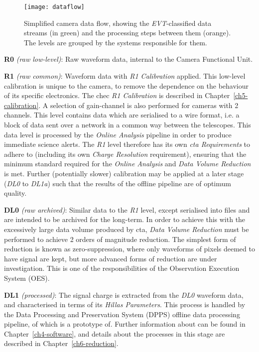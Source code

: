 \begin{wrapfigure}[36]{r}{0.32\textwidth}
  \texttt{[image: dataflow]}
  \caption{Simplified camera data flow, showing the \textit{EVT}-classified data streams (in green) and
the processing steps between them (orange). The levels are grouped by the systems responsible for them.}\label{fig:dataflow}
\end{wrapfigure}

\textbf{R0} \textit{(raw low-level)}:
Raw waveform data, internal to the Camera Functional Unit.

\textbf{R1} \textit{(raw common)}:
Waveform data with \textit{R1 Calibration} applied. This low-level calibration is unique to the camera, to remove the dependence on the behaviour of its specific electronics. The \gls{chec} \textit{R1 Calibration} is described in Chapter~\ref{ch5-calibration}. A selection of gain-channel is also performed for cameras with 2 channels. This level contains data which are serialised to a wire format, i.e. a block of data sent over a network in a common way between the telescopes. This data level is processed by the \textit{Online Analysis} pipeline in order to produce immediate science alerts. The \textit{R1} level therefore has its own \textit{\gls{cta} Requirements} to adhere to (including its own \textit{Charge Resolution} requirement), ensuring that the minimum standard required for the \textit{Online Analysis} and \textit{Data Volume Reduction} is met. Further (potentially slower) calibration may be applied at a later stage (\textit{DL0} to \textit{DL1a}) such that the results of the offline pipeline are of optimum quality.

\textbf{DL0} \textit{(raw archived)}: Similar data to the \textit{R1} level, except serialised into files and are intended to be archived for the long-term. In order to achieve this with the excessively large data volume produced by \gls{cta}, \textit{Data Volume Reduction} must be performed to achieve 2 orders of magnitude reduction. The simplest form of reduction is known as zero-suppression, where only waveforms of pixels deemed to have signal are kept, but more advanced forms of reduction are under investigation. This is one of the responsibilities of the Observation Execution System (OES).

\textbf{DL1} \textit{(processed)}: The signal charge is extracted from the \textit{DL0} waveform data, and characterised in terms of its \textit{Hillas Parameters}. This process is handled by the Data Processing and Preservation System (DPPS) offline data processing pipeline, of which  is a prototype of. Further information about  can be found in Chapter~\ref{ch4-software}, and details about the processes in this stage are described in Chapter~\ref{ch6-reduction}.

